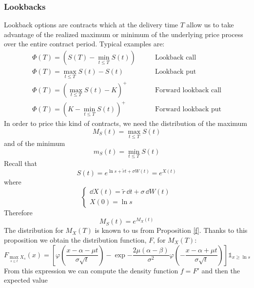 \subsubsection{Lookbacks}
Lookback options are contracts which at the delivery time $T$ allow us to take advantage of the realized maximum or minimum of the underlying price process over the entire contract period. Typical examples are:
\begin{align*}
    \Phi(T) = (S(T)-\min_{t\le T}S(t)) \qquad &\text{Lookback call} \\
    \Phi(T) = \max_{t\le T}S(t) - S(t) \qquad &\text{Lookback put} \\
    \Phi(T) = \left(\max_{t\le T}S(t) - K\right)^+ \qquad &\text{Forward lookback call} \\
    \Phi(T) = \left(K-\min_{t\le T}S(t)\right)^+ \qquad &\text{Forward lookback put}
\end{align*}
In order to price this kind of contracts, we need the distribution of the maximum
\begin{equation}
    M_S(t) = \max_{t\le T} S(t)
\end{equation}
and of the minimum
\begin{equation}
    m_S(t) = \min_{t\le T} S(t)
\end{equation}
Recall that
\begin{equation*}
    S(t) = e^{\ln s + \tilde{r} t + \sigma W(t)} = e^{X(t)}
\end{equation*}
where
\begin{equation*}
    \begin{cases}
        \dd X(t) = \tilde{r}\,\dd t + \sigma\,\dd W(t) \\
        X(0) = \ln s
    \end{cases}
\end{equation*}
Therefore
\begin{equation*}
    M_S(t) = e^{M_X(t)}
\end{equation*}
The distribution for $M_X(T)$ is known to us from Proposition \ref{f}. Thanks to this proposition we obtain the distribution function, $F$, for $M_X(T)$:
\begin{equation}
    F_{\max_{s\le t}X_s}(x) = \left[
    \varphi\left(\frac{x-\alpha-\mu t}{\sigma\sqrt{t}}\right)
    -\exp{-\frac{2\mu(\alpha-\beta)}{\sigma^2}}\varphi\left(-\frac{x-\alpha+\mu t}{\sigma\sqrt{t}}\right)
    \right]\mathds{1}_{x\ge\ln s}
\end{equation}
From this expression we can compute the density function $f=F'$ and then the expected value
